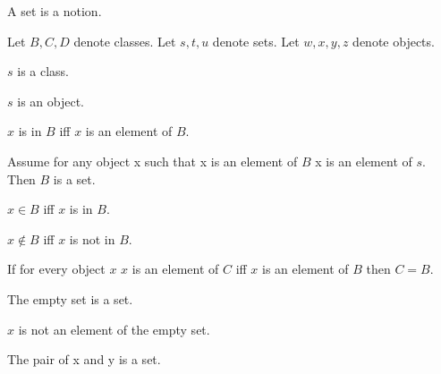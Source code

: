 \documentclass{article}
\begin{document}
  \begin{forthel}

    \begin{signature}
      A set is a notion.
    \end{signature}

    Let $B, C, D$ denote classes.
    Let $s, t, u$ denote sets.
    Let $w, x, y, z$ denote objects.

    \begin{axiom}
      $s$ is a class.
    \end{axiom}
    
    \begin{axiom}
      $s$ is an object.
    \end{axiom}

    \begin{definition}
      $x$ is in $B$ iff $x$ is an element of $B$.
    \end{definition}

    \begin{axiom}[SubclassOfSet]
      Assume for any object x such that x is an element of $B$ x is an element of $s$. Then $B$ is a set.
    \end{axiom}

    \begin{definition}
      $x \in B$ iff $x$ is in $B$.
    \end{definition}

    \begin{definition}
      $x \notin B$ iff $x$ is not in $B$.
    \end{definition}

    \begin{axiom}[Ext]
      If for every object $x$ $x$ is an element of $C$ iff $x$ is an element of $B$ then $C = B$.
    \end{axiom}

    \begin{signature}
      The empty set is a set.
    \end{signature}

    \begin{axiom}[Empty]
      $x$ is not an element of the empty set.
    \end{axiom}

    \begin{signature}
      The pair of x and y is a set.
    \end{signature}


\end{forthel}
\end{document}
